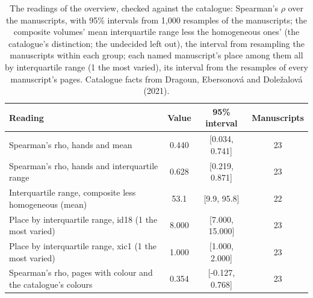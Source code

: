 \begin{table}[htbp]
  \centering
  \caption{The readings of the overview, checked against the catalogue: Spearman's $\rho$ over the manuscripts, with 95\% intervals from 1,000 resamples of the manuscripts; the composite volumes' mean interquartile range less the homogeneous ones' (the catalogue's distinction; the undecided left out), the interval from resampling the manuscripts within each group; each named manuscript's place among them all by interquartile range (1 the most varied), its interval from the resamples of every manuscript's pages. Catalogue facts from Dragoun, Ebersonová and Doležalová (2021).}
  \label{tab:crux_readings}
  \begin{tabular}{lccc}
    \toprule
    Reading & Value & 95\% interval & Manuscripts \\
    \midrule
    Spearman's rho, hands and mean & 0.440 & [0.034, 0.741] & 23 \\
    Spearman's rho, hands and interquartile range & 0.628 & [0.219, 0.871] & 23 \\
    Interquartile range, composite less homogeneous (mean) & 53.1 & [9.9, 95.8] & 22 \\
    Place by interquartile range, id18 (1 the most varied) & 8.000 & [7.000, 15.000] & 23 \\
    Place by interquartile range, xic1 (1 the most varied) & 1.000 & [1.000, 2.000] & 23 \\
    Spearman's rho, pages with colour and the catalogue's colours & 0.354 & [-0.127, 0.768] & 23 \\
    \bottomrule
  \end{tabular}
\end{table}

